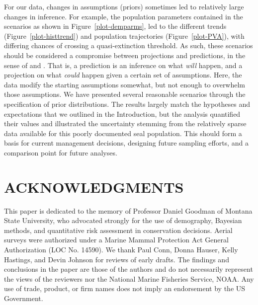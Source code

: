 \documentclass[12pt, titlepage]{article}\usepackage[]{graphicx}\usepackage[]{color}
\begin{document}
For our data, changes in assumptions (priors) sometimes led to relatively large changes in inference.  For example, the population parameters contained in the scenarios as shown in Figure~\ref{plot-demparms}, led to the different trends (Figure~\ref{plot-histtrend}) and population trajectories (Figure~\ref{plot-PVA}), with differing chances of crossing a quasi-extinction threshold.  As such, these scenarios should be considered a compromise between projections and predictions, in the sense of \citet{Keyf:futu:1972} and \citet[pg. 29]{Casw:matr:2001}.  That is, a prediction is an inference on what \emph{will} happen, and a projection on what \emph{could} happen given a certain set of assumptions.  Here, the data modify the starting assumptions somewhat, but not enough to overwhelm those assumptions.  We have presented several reasonable scenarios through the specification of prior distributions. The results largely match the hypotheses and expectations that we outlined in the Introduction, but the analysis quantified their values and illustrated the uncertainty stemming from the relatively sparse data available for this poorly documented seal population.  This should form a basis for current management decisions, designing future sampling efforts, and a comparison point for future analyses. 

 
\section*{ACKNOWLEDGMENTS} 

This paper is dedicated to the memory of Professor Daniel Goodman of Montana State University, who advocated strongly for the use of demography, Bayesian methods, and quantitative risk assessment in conservation decisions. Aerial surveys were authorized under a Marine Mammal Protection Act General Authorization (LOC No. 14590). We thank Paul Conn, Donna Hauser, Kelly Hastings, and Devin Johnson for reviews of early drafts. The findings and conclusions in the paper are those of the authors and do not necessarily represent the views of the reviewers nor the National Marine Fisheries Service, NOAA. Any use of trade, product, or firm names does not imply an endorsement by the US Government. 
\end{document}
